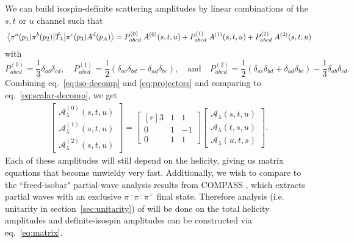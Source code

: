\documentclass[10pt, aps,prd,amsmath,amssymb,superscriptaddress,onecolumn,
nofootinbib,showpacs,preprintnumbers]{revtex4-1}
\begin{document}
We can build isospin-definite scattering amplitudes by linear combinations of the \(s,t \text{ or } u\) channel such that
	\begin{equation}\label{eq:iso-decomp}
	  \mel{\pi^a(p_1)\pi^b(p_2)}{\hat{T_\lambda}}{\pi^c(p_3)A^d(p_A)} = P^{(0)}_{abcd} \; A^{(0)}(s,t,u) + P^{(1)}_{abcd}  \; A^{(1)}(s,t,u) +  P^{(2)}_{abcd} \; A^{(2)}(s,t,u)
	\end{equation}
with
	\begin{equation} \label{eq:projectors}
	P^{(0)}_{abcd} = \frac{1}{3}\delta_{ab}\delta_{cd},  \quad P^{(1)}_{abcd} = \frac{1}{2}(\delta_{ac}\delta_{bd}-\delta_{ad}\delta_{bc}),  \quad \textrm{and} \quad   P^{(2)}_{abcd} = \frac{1}{2}
	(\delta_{ac}\delta_{bd} + \delta_{ad}\delta_{bc}) - \frac{1}{3} \delta_{ab}\delta_{cd}.
	\end{equation}
Combining eq.~\ref{eq:iso-decomp} and \ref{eq:projectors} and comparing to eq.~\ref{eq:scalar-decomp}, we get
    \begin{align} \label{eq:matrix}
      \begin{bmatrix}
      \mathcal{A}_\lambda^{(0)}(s,t,u) \\ \mathcal{A}_\lambda^{(1)} (s,t,u) \\ \mathcal{A}_\lambda^{(2)}(s,t,u)
      \end{bmatrix}
    =
      \begin{bmatrix*}[r]
        3 & 1 & 1 \\ 	0 & 1 & -1 \\ 0 & 1 & 1
      \end{bmatrix*}
      \begin{bmatrix}
      \mathcal{A}_\lambda(s,t,u) \\ \mathcal{A}_\lambda(t,s,u) \\ \mathcal{A}_\lambda(u,t,s)
      \end{bmatrix}.
    \end{align}
 Each of these amplitudes will still depend on the helicity, giving us matrix equations that become unwieldy very fast. Additionally, we wish to compare to the ``freed-isobar" partial-wave analysis results from COMPASS \cite{COMPASS-Swave,Krinner:2017vch}, which extracts partial waves with an exclusive \(\pi^-\pi^-\pi^+\) final state. Therefore analysis (i.e. unitarity in section~\ref{sec:unitarity}) of will be done on the total helicity amplitudes and definite-isospin amplitudes can be constructed via eq.~\ref{eq:matrix}.
\end{document}

